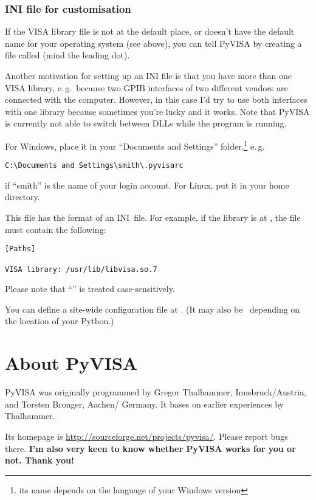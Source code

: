 \documentclass{howto}
\begin{document}
\subsubsection{INI file for customisation}

If the VISA library file is not at the default place, or doesn't have the
default name for your operating system (see above), you can tell PyVISA by
creating a file called  (mind the leading dot).

Another motivation for setting up an INI file is that you have more than one
VISA library, e.\,g.\ because two GPIB interfaces of two different vendors are
connected with the computer.  However, in this case I'd try to use both
interfaces with one library because sometimes you're lucky and it works.  Note
that PyVISA is currently not able to switch between DLLs while the program is
running.

For Windows, place it in your ``Documents and Settings'' folder,\footnote{its
  name depends on the language of your Windows version} e.\,g.\
\begin{verbatim}
C:\Documents and Settings\smith\.pyvisarc
\end{verbatim}
if ``smith'' is the name of your login account.  For Linux, put it in your home
directory.

This file has the format of an INI~file.  For example, if the library is at
\file{/usr/lib/libvisa.so.7}, the file \file{.pyvisarc} must contain the
following:
\begin{verbatim}
[Paths]

VISA library: /usr/lib/libvisa.so.7
\end{verbatim}
Please note that ``\code{[Paths]}'' is treated case-sensitively.

You can define a site-wide configuration file at
.  (It may also be \
depending on the location of your Python.)


\section{About PyVISA}

PyVISA was originally programmed by Gregor Thalhammer, Innsbruck/Austria, and
Torsten Bronger, Aachen/\hskip0pt Germany.  It bases on earlier experiences by
Thalhammer.

Its homepage is \url{http://sourceforge.net/projects/pyvisa/}.  Please report
bugs there.  \textbf{I'm also very keen to know whether PyVISA works for you or
  not.  Thank you!}  
\end{document}
